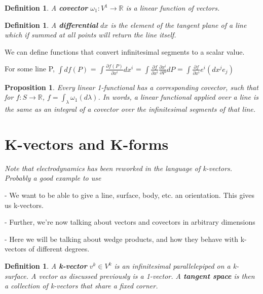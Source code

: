 \documentclass{book}
\newtheorem{defn}[equation]{Definition}
\newtheorem{prop}[equation]{Proposition}
\begin{document}
\begin{defn}
	A \textbf{covector} $\omega_1 : V^1 \to \mathbb{R}$ is a linear function of vectors. 
\end{defn}



\begin{defn}
	A \textbf{differential} $dx$ is the element of the tangent plane of a line which if summed at all points will return the line itself. 
\end{defn}

We can define functions that convert infinitesimal segments to a scalar value. 

For some line P, $\int df(P)$ = $\int \frac{\partial f(P)}{{\partial x^i}} dx^i$ = $\int \frac{\partial f}{\partial x^i}\frac{\partial x^i}{\partial P}dP$ = $\int \frac{{\partial f}}{{\partial x^i}} e^i (dx^j e_j)$






\begin{prop}
	Every linear 1-functional has a corresponding covector, such that for $f : S \to \mathbb{R}$, $f = \int_{\lambda} \omega_1(d\lambda)$. In words, a linear functional applied over a line is the same as an integral of a covector over the infinitesimal segments of that line. 
\end{prop}





\section{K-vectors and K-forms}

\emph{Note that electrodynamics has been reworked in the language of k-vectors. Probably a good example to use}





- We want to be able to give a line, surface, body, etc. an orientation. This gives us k-vectors.

- Further, we're now talking about vectors and covectors in arbitrary dimensions

- Here we will be talking about wedge products, and how they behave with k-vectors of different degrees. 



\begin{defn}
	A \textbf{k-vector} $v^k \in V^k$ is an infinitesimal parallelepiped on a k-surface. A vector as discussed previously is a 1-vector. A \textbf{tangent space} is then a collection of k-vectors that share a fixed corner. 
\end{defn}
\end{document}
